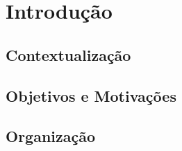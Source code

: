 \chapter{Introdução}
\label{cap:introducao}


\section{Contextualização}






\section{Objetivos e Motivações}



 


\section{Organização}


